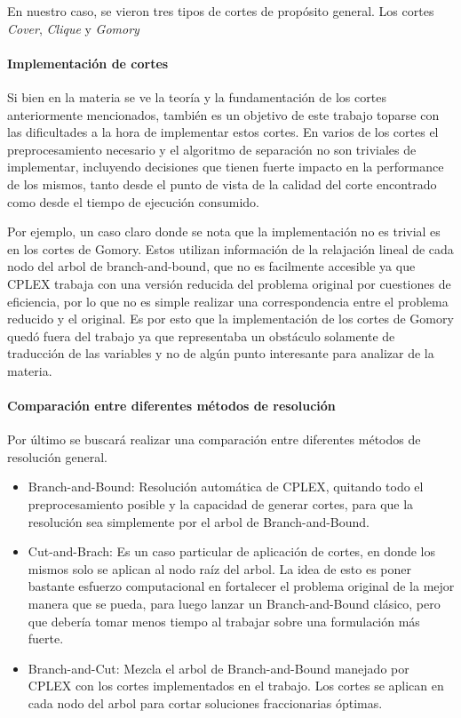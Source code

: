 En nuestro caso, se vieron tres tipos de cortes de prop\'osito general. Los cortes \emph{Cover}, \emph{Clique} y \emph{Gomory}



\paragraph{Implementaci\'on de cortes} 
\medskip
Si bien en la materia se ve la teor\'ia y la fundamentaci\'on de los cortes anteriormente mencionados, tambi\'en es un objetivo de este trabajo toparse con las dificultades a la hora de implementar estos cortes. En varios de los cortes el preprocesamiento necesario y el algoritmo de separaci\'on no son triviales de implementar, incluyendo decisiones que tienen fuerte impacto en la performance de los mismos, tanto desde el punto de vista de la calidad del corte encontrado como desde el tiempo de ejecuci\'on consumido.

Por ejemplo, un caso claro donde se nota que la implementaci\'on no es trivial es en los cortes de Gomory. Estos utilizan informaci\'on de la relajaci\'on lineal de cada nodo del arbol de branch-and-bound, que no es facilmente accesible ya que CPLEX trabaja con una versi\'on reducida del problema original por cuestiones de eficiencia, por lo que no es simple realizar una correspondencia entre el problema reducido y el original. Es por esto que la implementaci\'on de los cortes de Gomory qued\'o fuera del trabajo ya que representaba un obst\'aculo solamente de traducci\'on de las variables y no de alg\'un punto interesante para analizar de la materia.

\paragraph{Comparaci\'on entre diferentes m\'etodos de resoluci\'on} 
\medskip
Por \'ultimo se buscar\'a realizar una comparaci\'on entre diferentes m\'etodos de resoluci\'on general.

\begin{itemize}
\item Branch-and-Bound: Resoluci\'on autom\'atica de CPLEX, quitando todo el preprocesamiento posible y la capacidad de generar cortes, para que la resoluci\'on sea simplemente por el arbol de Branch-and-Bound.
\item Cut-and-Brach: Es un caso particular de aplicaci\'on de cortes, en donde los mismos solo se aplican al nodo ra\'iz del arbol. La idea de esto es poner bastante esfuerzo computacional en fortalecer el problema original de la mejor manera que se pueda, para luego lanzar un Branch-and-Bound cl\'asico, pero que deber\'ia tomar menos tiempo al trabajar sobre una formulaci\'on m\'as fuerte.
\item Branch-and-Cut: Mezcla el arbol de Branch-and-Bound manejado por CPLEX con los cortes implementados en el trabajo. Los cortes se aplican en cada nodo del arbol para cortar soluciones fraccionarias \'optimas.
\end{itemize}

